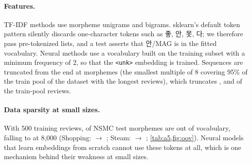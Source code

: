 \paragraph{Features.}
TF-IDF methods use morpheme unigrams and bigrams. sklearn's default token pattern
silently discards one-character tokens such as 좋, 안, 못, 다; we therefore pass
pre-tokenized lists, and a test asserts that 안/MAG is in the fitted vocabulary.
Neural methods use a vocabulary built on the training subset with a minimum frequency
of 2, so that the \texttt{<unk>} embedding is trained. Sequences are truncated from the
end at \maxSeqLenKiwi{} morphemes (the smallest multiple of 8 covering 95\% of the
train pool of the dataset with the longest reviews), which truncates
\truncKiwiNSMC, \truncKiwiShopping{} and \truncKiwiSteam{} of the train-pool reviews.

\paragraph{Data sparsity at small sizes.}
With 500 training reviews, \oovSmallNSMC{} of NSMC test morphemes are out of vocabulary,
falling to \oovLargeNSMC{} at 8{,}000 (Shopping: \oovSmallShopping{} $\to$ \oovLargeShopping;
Steam: \oovSmallSteam{} $\to$ \oovLargeSteam; \cref{tab:a5,fig:oov}). Neural models that
learn embeddings from scratch cannot use these tokens at all, which is one mechanism
behind their weakness at small sizes.
